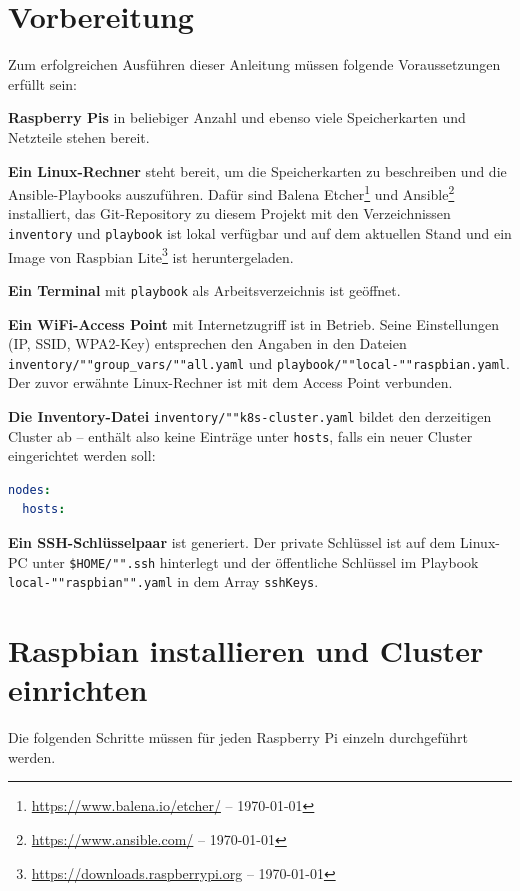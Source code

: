 \section{Vorbereitung}\label{sec:vorbereitung}
Zum erfolgreichen Ausführen dieser Anleitung müssen folgende Voraussetzungen erfüllt sein:

\textbf{Raspberry Pis} in beliebiger Anzahl und ebenso viele Speicherkarten und Netzteile stehen bereit.

\textbf{Ein Linux-Rechner} steht bereit, um die Speicherkarten zu beschreiben und die Ansible-Playbooks auszuführen. Dafür sind Balena Etcher\footnote{\url{https://www.balena.io/etcher/} -- \today} und Ansible\footnote{\url{https://www.ansible.com/} -- \today} installiert, das Git-Repository zu diesem Projekt mit den Verzeichnissen \texttt{inventory} und \texttt{playbook} ist lokal verfügbar und auf dem aktuellen Stand und ein Image von Raspbian Lite\footnote{\url{https://downloads.raspberrypi.org} -- \today} ist heruntergeladen.

\textbf{Ein Terminal} mit \texttt{playbook} als Arbeitsverzeichnis ist geöffnet.

\textbf{Ein WiFi-Access Point} mit Internetzugriff ist in Betrieb. Seine Einstellungen (IP, SSID, WPA2-Key) entsprechen den Angaben in den Dateien \texttt{inventory/""group\_vars/""all.yaml} und \texttt{playbook/""local-""raspbian.yaml}. Der zuvor erwähnte Linux-Rechner ist mit dem Access Point verbunden.

\textbf{Die Inventory-Datei} \texttt{inventory/""k8s-cluster.yaml} bildet den derzeitigen Cluster ab -- enthält also keine Einträge unter \texttt{hosts}, falls ein neuer Cluster eingerichtet werden soll:

\begin{lstlisting}[language=yaml, caption=Leere Inventory-Datei]
nodes:
  hosts:
\end{lstlisting}

\textbf{Ein SSH-Schlüsselpaar} ist generiert. Der private Schlüssel ist auf dem Linux-PC unter \texttt{\$HOME/"".ssh} hinterlegt und der öffentliche Schlüssel im Playbook \texttt{local-""raspbian"".yaml} in dem Array \texttt{sshKeys}.

\section{Raspbian installieren und Cluster einrichten}\label{sec:raspbian-installieren}
Die folgenden Schritte müssen für jeden Raspberry Pi einzeln durchgeführt werden.

